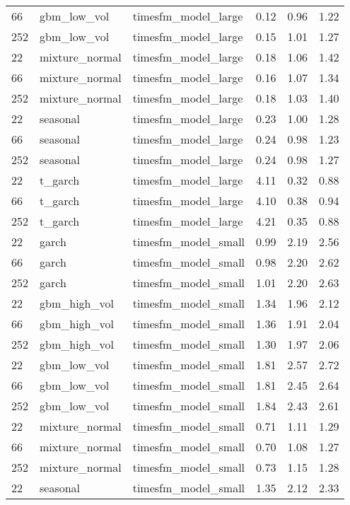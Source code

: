 {\begin{tabular}{lllrrr}
66 & gbm\_low\_vol & timesfm\_model\_large & 0.12 & 0.96 & 1.22 \\
252 & gbm\_low\_vol & timesfm\_model\_large & 0.15 & 1.01 & 1.27 \\
\midrule
22 & mixture\_normal & timesfm\_model\_large & 0.18 & 1.06 & 1.42 \\
66 & mixture\_normal & timesfm\_model\_large & 0.16 & 1.07 & 1.34 \\
252 & mixture\_normal & timesfm\_model\_large & 0.18 & 1.03 & 1.40 \\
\midrule
22 & seasonal & timesfm\_model\_large & 0.23 & 1.00 & 1.28 \\
66 & seasonal & timesfm\_model\_large & 0.24 & 0.98 & 1.23 \\
252 & seasonal & timesfm\_model\_large & 0.24 & 0.98 & 1.27 \\
\midrule
22 & t\_garch & timesfm\_model\_large & 4.11 & 0.32 & 0.88 \\
66 & t\_garch & timesfm\_model\_large & 4.10 & 0.38 & 0.94 \\
252 & t\_garch & timesfm\_model\_large & 4.21 & 0.35 & 0.88 \\
\midrule
22 & garch & timesfm\_model\_small & 0.99 & 2.19 & 2.56 \\
66 & garch & timesfm\_model\_small & 0.98 & 2.20 & 2.62 \\
252 & garch & timesfm\_model\_small & 1.01 & 2.20 & 2.63 \\
\midrule
22 & gbm\_high\_vol & timesfm\_model\_small & 1.34 & 1.96 & 2.12 \\
66 & gbm\_high\_vol & timesfm\_model\_small & 1.36 & 1.91 & 2.04 \\
252 & gbm\_high\_vol & timesfm\_model\_small & 1.30 & 1.97 & 2.06 \\
\midrule
22 & gbm\_low\_vol & timesfm\_model\_small & 1.81 & 2.57 & 2.72 \\
66 & gbm\_low\_vol & timesfm\_model\_small & 1.81 & 2.45 & 2.64 \\
252 & gbm\_low\_vol & timesfm\_model\_small & 1.84 & 2.43 & 2.61 \\
\midrule
22 & mixture\_normal & timesfm\_model\_small & 0.71 & 1.11 & 1.29 \\
66 & mixture\_normal & timesfm\_model\_small & 0.70 & 1.08 & 1.27 \\
252 & mixture\_normal & timesfm\_model\_small & 0.73 & 1.15 & 1.28 \\
\midrule
22 & seasonal & timesfm\_model\_small & 1.35 & 2.12 & 2.33 \\

\end{tabular}}
